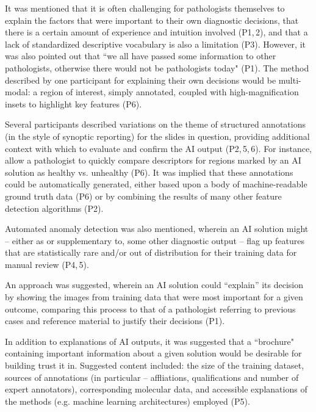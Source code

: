\documentclass[final,5p,times,twocolumn,hyphens]{elsarticle}
\begin{document}
It was mentioned that it is often challenging for pathologists themselves to explain the factors that were important to their own diagnostic decisions, that there is a certain amount of experience and intuition involved (P1,\,2), and that a lack of standardized descriptive vocabulary is also a limitation (P3). However, it was also pointed out that ``we all have passed some information to other pathologists, otherwise there would not be pathologists today" (P1). The method described by one participant for explaining their own decisions would be multi-modal: a region of interest, simply annotated, coupled with high-magnification insets to highlight key features (P6).


Several participants described variations on the theme of structured annotations (in the style of synoptic reporting) for the slides in question, providing additional context with which to evaluate and confirm the AI output (P2,\,5,\,6). For instance, allow a pathologist to quickly compare descriptors for regions marked by an AI solution as healthy vs. unhealthy (P6). It was implied that these annotations could be automatically generated, either based upon a body of machine-readable ground truth data (P6) or by combining the results of many other feature detection algorithms (P2). 

Automated anomaly detection was also mentioned, wherein an AI solution might -- either as or supplementary to, some other diagnostic output -- flag up features that are statistically rare and/or out of distribution for their training data for manual review (P4,\,5).

An approach was suggested, wherein an AI solution could ``explain'' its decision by showing the images from training data that were most important for a given outcome, comparing this process to that of a pathologist referring to previous cases and reference material to justify their decisions (P1).

In addition to explanations of AI outputs, it was suggested that a ``brochure" containing important information about a given solution would be desirable for building trust it in. Suggested content included: the size of the training dataset, sources of annotations (in particular -- affliations, qualifications and number of expert annotators), corresponding molecular data, and accessible explanations of the methods (e.g. machine learning architectures) employed (P5). 
\end{document}
